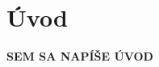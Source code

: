 \documentclass[report.tex]{subfiles}
\begin{document}
	
	\section{Úvod}	
	
	\textbf{SEM SA NAPÍŠE ÚVOD}
	
\end{document}
